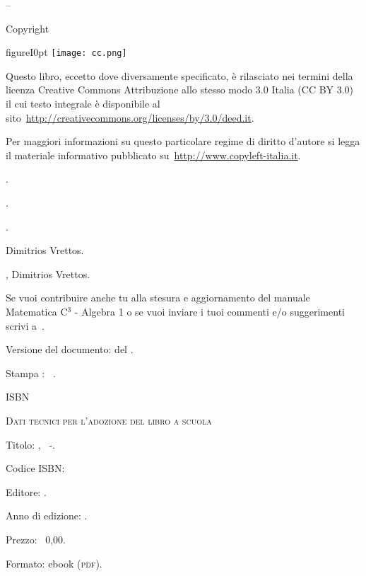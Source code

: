 \thispagestyle{empty}
{\setlength{\parindent}{0em}\small{
\begin{center}
{\large{\serie – \titolo}}

Copyright {\textcopyright} {\anno} \editore
\end{center}

\begin{wrapfloat}{figure}{I}{0pt}
\texttt{[image: cc.png]}
\end{wrapfloat}

Questo libro, eccetto dove diversamente specificato, è rilasciato nei termini 
della licenza Creative Commons Attribuzione allo stesso modo 3.0 Italia
(CC BY 3.0) il cui testo integrale è disponibile al 
sito~\url{http://creativecommons.org/licenses/by/3.0/deed.it}.

 Per maggiori informazioni su questo particolare regime di diritto d'autore si
legga il materiale informativo pubblicato su~\url{http://www.copyleft-italia.it}.

 \coord .

 \autori.

 \colab.

 {Dimitrios Vrettos}.

 {\texcol, Dimitrios Vrettos}.

 Se vuoi contribuire anche tu alla stesura e aggiornamento
del manuale Matematica C$^3$ - Algebra 1 o se vuoi inviare i tuoi commenti e/o suggerimenti scrivi
a~.

\vspace{2ex}
 Versione del documento: {\docvers} del {\oggi}.

 Stampa \edizione : \mese\ \anno.

 ISBN \mcisbn

\vspace{2ex}
 {\scshape{Dati tecnici per l'adozione del libro a scuola}}

 Titolo: \serie, \titolo\ -\edizione.

 Codice ISBN: \mcisbn

 Editore: \href{http://www.matematicamente.it}{\editore}.

 Anno di edizione: \anno.

 Prezzo: \officialeuro\ 0,00.

 Formato: ebook (\scshape{pdf}).
}}
\cleardoublepage
